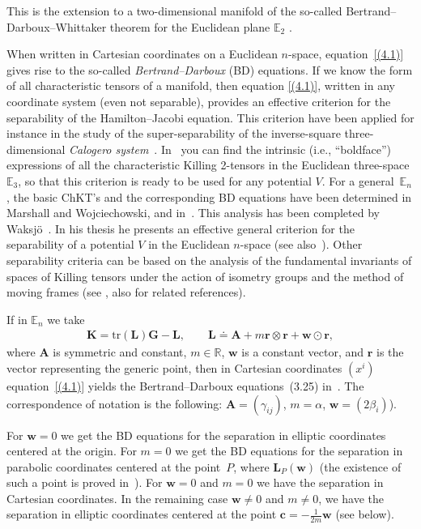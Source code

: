 \documentclass[pdftex]{sigma}
\def\bs{\boldsymbol}
\numberwithin{equation}{section}
\begin{document}
This is the extension to a two-dimensional manifold of the so-called Bertrand--Darboux--Whittaker theorem for the Euclidean plane $\mathbb E_2$ \cite{Ankiewicz-1983,Whittaker-1937}.

When written in Cartesian coordinates on a Euclidean $n$-space, equation~\eqref{(4.1)} gives rise to the so-called {\it Bertrand--Darboux} (BD) equations.
If we know the form of all characteristic tensors of a manifold, then equation \eqref{(4.1)}, written in any coordinate system (even not separable), provides an ef\/fective criterion for the separability of the Hamilton--Jacobi equation. This criterion have been applied for instance in the study of the super-separability of the inverse-square three-dimensional {\it Calogero system}~\cite{BCR-2000}. In~\cite{BCR-2000} you can f\/ind the intrinsic (i.e., ``boldface'') expressions of all the characteristic Killing 2-tensors in the Euclidean three-space $\mathbb E_3$, so that this criterion is ready to be used for any potential $V$. For a general~$\mathbb E_n$, the basic ChKT's and the corresponding BD equations have been determined in Marshall and Wojciechowski, and in~\cite{Benenti-1992b,Benenti-1993}. This analysis has been completed by Waksj\"o~\cite{Waksjo-2000}. In his thesis he presents an ef\/fective general criterion for the separability of a potential $V$ in the Euclidean $n$-space (see also~\cite{Waksjo-Rauch-Wojciechowski-2003}). Other separability criteria can be based on the analysis of the fundamental invariants of spaces of Killing tensors under the action of isometry groups and the method of moving frames (see \cite{DHMcLS-2004, McLenaghan-Smirnov-2002}, also for related references).

If in $\mathbb E_n$ we take
\begin{gather}
\bs K=\text{tr}(\bs L) \bs G-\bs L, \qquad
\bs L\doteq\bs A+ m \bs r\otimes\bs r + \bs w \odot \bs r,
\label{(4.2)}
\end{gather}
where $\bs A$ is symmetric and constant, $m\in\mathbb R$, $\bs w$ is a constant vector, and $\bs r$ is the vector representing the generic point,
then in Cartesian coordinates $(x^i)$ equation~\eqref{(4.1)} yields the Bertrand--Darboux equations~(3.25) in~\cite{Waksjo-2000}. The correspondence of notation is the following: $\bs A=(\gamma_{ij})$, $m=\alpha$, $\bs w =(2 \beta_i)$).

For $\bs w=0$ we get the BD equations for the separation in elliptic coordinates centered at the origin. For $m=0$ we get the BD equations for the separation in parabolic coordinates centered at the point~$P$, where $\bs L_P(\bs w)$ (the existence of such a point is proved in~\cite{Benenti-1992b}). For $\bs w=0$ and $m=0$ we have the separation in Cartesian coordinates. In the remaining case $\bs w\ne 0$ and $m\ne 0$, we have the separation in elliptic coordinates centered at the point $\bs c= -\tfrac 1{2m}\bs w$ (see below).
\end{document}
